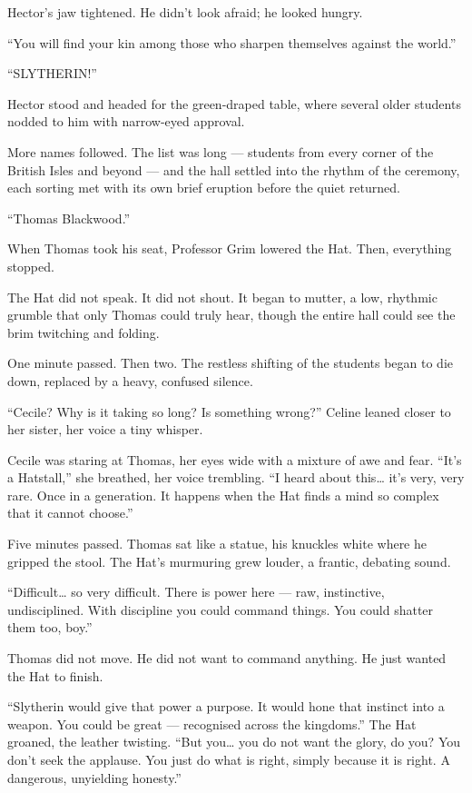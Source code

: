 Hector's jaw tightened. He didn't look afraid; he looked hungry.
 
\enquote{You will find your kin among those who sharpen themselves against the world.}
 
\enquote{SLYTHERIN!}
 
Hector stood and headed for the green-draped table, where several older students nodded to him with narrow-eyed approval.
 
More names followed. The list was long --- students from every corner of the British Isles and beyond --- and the hall settled into the rhythm of the ceremony, each sorting met with its own brief eruption before the quiet returned.

\vspace{1.5\baselineskip}

\enquote{Thomas Blackwood.}

When Thomas took his seat, Professor Grim lowered the Hat. Then, everything stopped.
 
The Hat did not speak. It did not shout. It began to mutter, a low, rhythmic grumble that only Thomas could truly hear, though the entire hall could see the brim twitching and folding.
 
One minute passed. Then two. The restless shifting of the students began to die down, replaced by a heavy, confused silence.
 
\enquote{Cecile? Why is it taking so long? Is something wrong?} Celine leaned closer to her sister, her voice a tiny whisper.
 
Cecile was staring at Thomas, her eyes wide with a mixture of awe and fear. \enquote{It's a Hatstall,} she breathed, her voice trembling. \enquote{I heard about this\ldots{} it's very, very rare. Once in a generation. It happens when the Hat finds a mind so complex that it cannot choose.}
 
Five minutes passed. Thomas sat like a statue, his knuckles white where he gripped the stool. The Hat's murmuring grew louder, a frantic, debating sound.
 
\enquote{Difficult\ldots{} so very difficult. There is power here --- raw, instinctive, undisciplined. With discipline you could command things. You could shatter them too, boy.}
 
Thomas did not move. He did not want to command anything. He just wanted the Hat to finish.
 
\enquote{Slytherin would give that power a purpose. It would hone that instinct into a weapon. You could be great --- recognised across the kingdoms.} The Hat groaned, the leather twisting. \enquote{But you\ldots{} you do not want the glory, do you? You don't seek the applause. You just do what is right, simply because it is right. A dangerous, unyielding honesty.}
 
